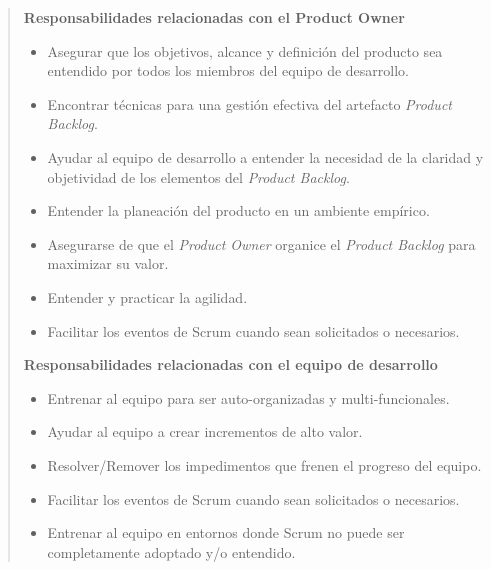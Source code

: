    \begin{quote}
        {\bf Responsabilidades relacionadas con el Product Owner }
        \begin{itemize}
        \item Asegurar que los objetivos, alcance y definición del producto sea
              entendido por todos los miembros del equipo de desarrollo.

        \item Encontrar técnicas para una gestión efectiva del artefacto
              {\it Product Backlog}.

        \item Ayudar al equipo de desarrollo a entender la necesidad de la claridad
              y objetividad de los elementos del {\it Product Backlog}.

        \item Entender la planeación del producto en un ambiente empírico.

        \item Asegurarse de que el {\it Product Owner} organice el {\it Product
              Backlog} para maximizar su valor.

        \item Entender y practicar la agilidad.

        \item Facilitar los eventos de Scrum cuando sean solicitados o necesarios.\\
        \end{itemize}

        {\bf Responsabilidades relacionadas con el equipo de desarrollo}
        \begin{itemize}
        \item Entrenar al equipo para ser auto-organizadas y multi-funcionales.
        \item Ayudar al equipo a crear incrementos de alto valor.
        \item Resolver/Remover los impedimentos que frenen el progreso del equipo.
        \item Facilitar los eventos de Scrum cuando sean solicitados o necesarios.
        \item Entrenar al equipo en entornos donde Scrum no puede ser completamente
                adoptado y/o entendido.\\
        \end{itemize}

    \end{quote}

